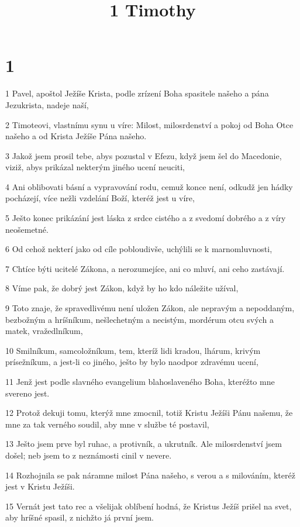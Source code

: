 

\title{1 Timothy}

\chapter{1}

\par 1 Pavel, apoštol Ježíše Krista, podle zrízení Boha spasitele našeho a pána Jezukrista, nadeje naší,
\par 2 Timoteovi, vlastnímu synu u víre: Milost, milosrdenství a pokoj od Boha Otce našeho a od Krista Ježíše Pána našeho.
\par 3 Jakož jsem prosil tebe, abys pozustal v Efezu, když jsem šel do Macedonie, viziž, abys prikázal nekterým jiného ucení neuciti,
\par 4 Ani oblibovati básní a vypravování rodu, cemuž konce není, odkudž jen hádky pocházejí, více nežli vzdelání Boží, kteréž jest u víre,
\par 5 Ješto konec prikázání jest láska z srdce cistého a z svedomí dobrého a z víry neošemetné.
\par 6 Od cehož nekterí jako od cíle pobloudivše, uchýlili se k marnomluvnosti,
\par 7 Chtíce býti ucitelé Zákona, a nerozumejíce, ani co mluví, ani ceho zastávají.
\par 8 Víme pak, že dobrý jest Zákon, když by ho kdo náležite užíval,
\par 9 Toto znaje, že spravedlivému není uložen Zákon, ale nepravým a nepoddaným, bezbožným a hríšníkum, nešlechetným a necistým, mordérum otcu svých a matek, vražedlníkum,
\par 10 Smilníkum, samcoložníkum, tem, kteríž lidi kradou, lhárum, krivým prísežníkum, a jest-li co jiného, ješto by bylo naodpor zdravému ucení,
\par 11 Jenž jest podle slavného evangelium blahoslaveného Boha, kteréžto mne svereno jest.
\par 12 Protož dekuji tomu, kterýž mne zmocnil, totiž Kristu Ježíši Pánu našemu, že mne za tak verného soudil, aby mne v službe té postavil,
\par 13 Ješto jsem prve byl ruhac, a protivník, a ukrutník. Ale milosrdenství jsem došel; neb jsem to z neznámosti cinil v nevere.
\par 14 Rozhojnila se pak náramne milost Pána našeho, s verou a s milováním, kteréž jest v Kristu Ježíši.
\par 15 Vernát jest tato rec a všelijak oblíbení hodná, že Kristus Ježíš prišel na svet, aby hríšné spasil, z nichžto já první jsem.
